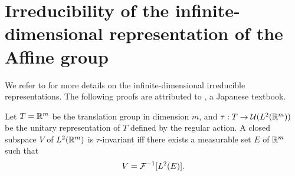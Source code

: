 \section{Irreducibility of the infinite-dimensional representation of the Affine group} \label{sec:irrep.affine}

We refer to \citet[Theorem~6.42]{Folland2015} for more details on the infinite-dimensional irreducible representations. The following proofs are attributed to \citet{KobayashiOshima.LieRep.book}, a Japanese textbook.


\begin{lemma}\label{lem:structure.translation.l2}
Let $T = \mathbb{R}^m$ be the translation group in dimension $m$,
and $\tau : T \to \mathcal{U}(L^2(\mathbb{R}^m))$ be the unitary representation of $T$ defined by the regular action.
A closed subspace $V$ of $L^2(\mathbb{R}^m)$ is $\tau$-invariant iff there exists a measurable set $E$ of $\mathbb{R}^m$ such that 
\begin{align*}
    V = \mathcal{F}^{-1}[ L^2(E) ].
\end{align*}
\end{lemma}

